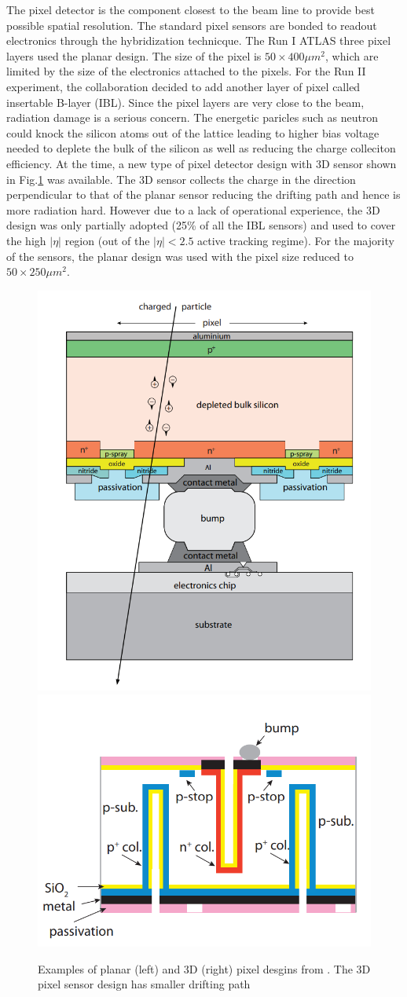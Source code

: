The pixel detector is the component closest to the beam line to provide best possible spatial resolution. The standard pixel sensors are bonded to readout electronics through the hybridization technicque. The Run I ATLAS three pixel layers used the planar design. The size of the pixel is $50\times 400 \mu m^2$, which are limited by the size of the electronics attached to the pixels. For the Run II experiment, the collaboration decided to add another layer of pixel called insertable B-layer (IBL). Since the pixel layers are very close to the beam, radiation damage is a serious concern. The energetic paricles such as neutron could knock the silicon atoms out of the lattice leading to higher bias voltage needed to deplete the bulk of the silicon as well as reducing the charge colleciton efficiency. At the time, a new type of pixel detector design with 3D sensor shown in Fig.\ref{fig:detector-sensor} was available. The 3D sensor collects the charge in the direction perpendicular to that of the planar sensor reducing the drifting path and hence is more radiation hard. However due to a lack of operational experience, the 3D design was only partially adopted (25\% of all the IBL sensors) and used to cover the high $|\eta|$ region (out of the $|\eta|<2.5$ active tracking regime). For the majority of the sensors, the planar design was used with the pixel size reduced to $50\times 250\mu m^2$. 

\begin{figure}[htpb!]
\begin{center}
  \includegraphics[width=0.35\linewidth]{figures/detector/PixelPlanar}
  \includegraphics[width=0.40\linewidth]{figures/detector/Pixel3D}
\caption{Examples of planar (left) and 3D (right) pixel desgins from \cite{PixReview}. The 3D pixel sensor design has smaller drifting path }
\label{fig:detector-sensor}
\end{center}
\end{figure}



